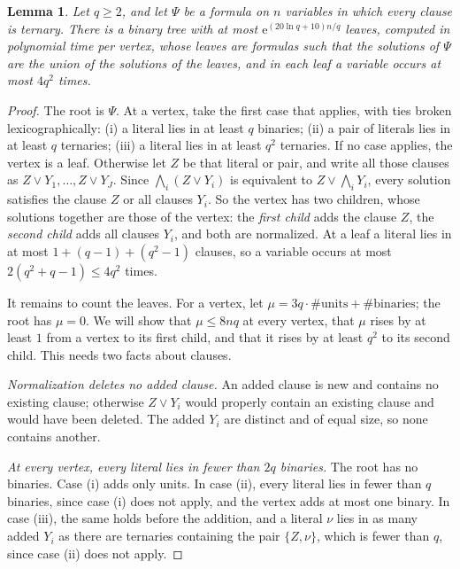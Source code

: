 \documentclass[11pt]{article}
\newtheorem{lemma}{Lemma}
\begin{document}
\begin{lemma}\label{lem:branch}
Let $q\ge2$, and let $\Psi$ be a formula on $n$ variables in which every clause is ternary. There is a binary tree with at most $\mathrm e^{(20\ln q+10)n/q}$ leaves, computed in polynomial time per vertex, whose leaves are formulas such that the solutions of $\Psi$ are the union of the solutions of the leaves, and in each leaf a variable occurs at most $4q^2$ times.
\end{lemma}

\begin{proof}
The root is $\Psi$. At a vertex, take the first case that applies, with ties broken lexicographically: (i) a literal lies in at least $q$ binaries; (ii) a pair of literals lies in at least $q$ ternaries; (iii) a literal lies in at least $q^2$ ternaries. If no case applies, the vertex is a leaf. Otherwise let $Z$ be that literal or pair, and write all those clauses as $Z\vee Y_1,\dots,Z\vee Y_J$. Since $\bigwedge_i(Z\vee Y_i)$ is equivalent to $Z\vee\bigwedge_iY_i$, every solution satisfies the clause $Z$ or all clauses $Y_i$. So the vertex has two children, whose solutions together are those of the vertex: the \emph{first child} adds the clause $Z$, the \emph{second child} adds all clauses $Y_i$, and both are normalized. At a leaf a literal lies in at most $1+(q-1)+(q^2-1)$ clauses, so a variable occurs at most $2(q^2+q-1)\le4q^2$ times.

It remains to count the leaves. For a vertex, let $\mu=3q\cdot\#\text{units}+\#\text{binaries}$; the root has $\mu=0$. We will show that $\mu\le8nq$ at every vertex, that $\mu$ rises by at least $1$ from a vertex to its first child, and that it rises by at least $q^2$ to its second child. This needs two facts about clauses.

\emph{Normalization deletes no added clause.} An added clause is new and contains no existing clause; otherwise $Z\vee Y_i$ would properly contain an existing clause and would have been deleted. The added $Y_i$ are distinct and of equal size, so none contains another.

\emph{At every vertex, every literal lies in fewer than $2q$ binaries.} The root has no binaries. Case (i) adds only units. In case (ii), every literal lies in fewer than $q$ binaries, since case (i) does not apply, and the vertex adds at most one binary. In case (iii), the same holds before the addition, and a literal $\nu$ lies in as many added $Y_i$ as there are ternaries containing the pair $\{Z,\nu\}$, which is fewer than $q$, since case (ii) does not apply.


\end{proof}
\end{document}
